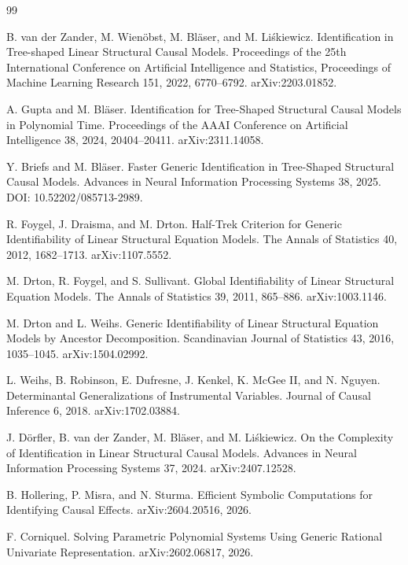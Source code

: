 \documentclass{article}
\begin{document}
\begin{thebibliography}{99}

   B. van der Zander, M. Wienöbst, M. Bläser, and M. Liśkiewicz. Identification in Tree-shaped Linear Structural Causal Models. Proceedings of the 25th International Conference on Artificial Intelligence and Statistics, Proceedings of Machine Learning Research 151, 2022, 6770--6792. arXiv:2203.01852.

   A. Gupta and M. Bläser. Identification for Tree-Shaped Structural Causal Models in Polynomial Time. Proceedings of the AAAI Conference on Artificial Intelligence 38, 2024, 20404--20411. arXiv:2311.14058.

   Y. Briefs and M. Bläser. Faster Generic Identification in Tree-Shaped Structural Causal Models. Advances in Neural Information Processing Systems 38, 2025. DOI: 10.52202/085713-2989.

   R. Foygel, J. Draisma, and M. Drton. Half-Trek Criterion for Generic Identifiability of Linear Structural Equation Models. The Annals of Statistics 40, 2012, 1682--1713. arXiv:1107.5552.

   M. Drton, R. Foygel, and S. Sullivant. Global Identifiability of Linear Structural Equation Models. The Annals of Statistics 39, 2011, 865--886. arXiv:1003.1146.

   M. Drton and L. Weihs. Generic Identifiability of Linear Structural Equation Models by Ancestor Decomposition. Scandinavian Journal of Statistics 43, 2016, 1035--1045. arXiv:1504.02992.

   L. Weihs, B. Robinson, E. Dufresne, J. Kenkel, K. McGee II, and N. Nguyen. Determinantal Generalizations of Instrumental Variables. Journal of Causal Inference 6, 2018. arXiv:1702.03884.

   J. Dörfler, B. van der Zander, M. Bläser, and M. Liśkiewicz. On the Complexity of Identification in Linear Structural Causal Models. Advances in Neural Information Processing Systems 37, 2024. arXiv:2407.12528.

   B. Hollering, P. Misra, and N. Sturma. Efficient Symbolic Computations for Identifying Causal Effects. arXiv:2604.20516, 2026.

   F. Corniquel. Solving Parametric Polynomial Systems Using Generic Rational Univariate Representation. arXiv:2602.06817, 2026.


\end{thebibliography}
\end{document}
